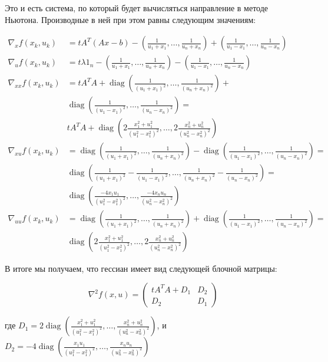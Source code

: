 \documentclass[11pt]{article}
\DeclareMathOperator{\diag}{diag}
\begin{document}
Это и есть система, по который будет вычисляться направление в методе Ньютона. Производные в ней при этом равны следующим значениям:

\begin{align*}
\nabla_x f(x_k, u_k) &= t A^T (Ax - b) - 
\left(\frac{1}{u_1 + x_1}, \dots, \frac{1}{u_n + x_n} \right) + 
\left(\frac{1}{u_1 - x_1}, \dots, \frac{1}{u_n - x_n} \right)
\\ 
\nabla_u f(x_k, u_k) &= t  \lambda  1_n - 
\left(\frac{1}{u_1 + x_1}, \dots, \frac{1}{u_n + x_n} \right) - 
\left(\frac{1}{u_1 - x_1}, \dots, \frac{1}{u_n - x_n} \right)
\\
\nabla_{xx} f(x_k, u_k) &= t A^T A + 
\diag \left(\frac{1}{(u_1 + x_1)^2}, \dots, \frac{1}{(u_n + x_n)^2} \right) + \\
& \diag \left(\frac{1}{(u_1 - x_1)^2}, \dots, \frac{1}{(u_n - x_n)^2} \right) = \\
& t A^T A + \diag \left(2 \frac{x_1^2 + u_1^2}{(u_1^2 - x_1^2)^2}, \dots, 2\frac{x_n^2 + u_n^2}{(u_n^2 - x_n^2)^2} \right)
\\
\nabla_{xu} f(x_k, u_k) &=
\diag \left(\frac{1}{(u_1 + x_1)^2}, \dots, \frac{1}{(u_n + x_n)^2} \right) - 
\diag \left(\frac{1}{(u_1 - x_1)^2}, \dots, \frac{1}{(u_n - x_n)^2} \right) = \\
 & \diag \left(\frac{1}{(u_1 + x_1)^2} - \frac{1}{(u_1 - x_1)^2}, \dots, \frac{1}{(u_n + x_n)^2} - \frac{1}{(u_n - x_n)^2} \right)  = \\
 & \diag \left(\frac{ -4 x_1 u_1}{(u_1^2 - x_1^2)^2}, \dots, 
\frac{ -4 x_n u_n}{(u_n^2 - x_n^2)^2} \right) 
\\ 
\nabla_{uu} f(x_k, u_k) &=
\diag\left(\frac{1}{(u_1 + x_1)^2}, \dots, \frac{1}{(u_n + x_n)^2} \right) + 
\diag\left(\frac{1}{(u_1 - x_1)^2}, \dots, \frac{1}{(u_n - x_n)^2} \right) = \\
& \diag \left(2 \frac{x_1^2 + u_1^2}{(u_1^2 - x_1^2)^2}, \dots, 2\frac{x_n^2 + u_n^2}{(u_n^2 - x_n^2)^2} \right)
\end{align*}

В итоге мы получаем, что гессиан имеет вид следующей блочной матрицы:

$$\nabla^2f(x,u) = 
\begin{pmatrix}
		t A^T A + D_1 &  D_2 \\
		D_2 					&  D_1
\end{pmatrix}
$$

где $D_1 = 2 \diag \left( \frac{x_1^2 + u_1^2}{(u_1^2 - x_1^2)^2}, \dots, \frac{x_n^2 + u_n^2}{(u_n^2 - x_n^2)^2} \right)$, и $D_2 = -4 \diag \left(\frac{x_1 u_1}{(u_1^2 - x_1^2)^2}, \dots, 
\frac{x_n u_n}{(u_n^2 - x_n^2)^2} \right) $
\end{document}

